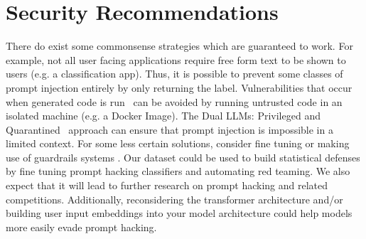 \section{Security Recommendations}
\label{appx:recommendations}

There do exist some commonsense strategies which are guaranteed to work. For example, not all user facing applications require free form text to be shown to users (e.g. a classification app). Thus, it is possible to prevent some classes of prompt injection entirely by only returning the label.
Vulnerabilities that occur when \llm{} generated code is run~\cite{ludwig2023achieving} can be avoided by running untrusted code in an isolated machine (e.g. a Docker Image). The Dual LLMs: Privileged and Quarantined~\cite{willison2023the} approach can ensure that prompt injection is impossible in a limited context. For some less certain solutions, consider fine tuning or making use of guardrails systems \cite{dinu2023NeMo}. 
Our dataset could be used to build statistical defenses by fine tuning prompt hacking classifiers and automating red teaming. We also expect that it will lead to further research on prompt hacking \cite{shen2023characterizing} and related competitions\cite{Gandalf2023}.
Additionally, reconsidering the transformer architecture and/or building user input embeddings into your model architecture could help models more easily evade prompt hacking.
